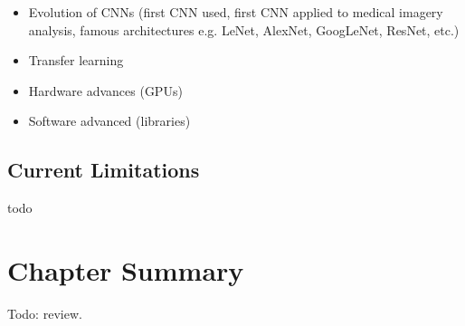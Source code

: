 \begin{itemize}
    \item Evolution of CNNs (first CNN used, first CNN applied to medical imagery analysis, famous architectures e.g. LeNet, AlexNet, GoogLeNet, ResNet, etc.)
    \item Transfer learning
    \item Hardware advances (GPUs)
    \item Software advanced (libraries)
\end{itemize}

\subsection{Current Limitations}

todo


\section{Chapter Summary}

Todo: review.
